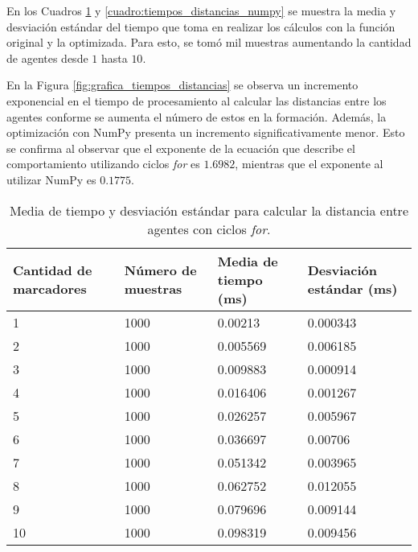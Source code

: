 En los Cuadros \ref{cuadro:tiempos_distancias_for} y \ref{cuadro:tiempos_distancias_numpy} se muestra la media y desviación estándar del tiempo que toma en realizar los cálculos con la función original y la optimizada. Para esto, se tomó mil muestras aumentando la cantidad de agentes desde $1$ hasta $10$. 

En la Figura \ref{fig:grafica_tiempos_distancias} se observa un incremento exponencial en el tiempo de procesamiento al calcular las distancias entre los agentes conforme se aumenta el número de estos en la formación. Además, la optimización con NumPy presenta un incremento significativamente menor. Esto se confirma al observar que el exponente de la ecuación que describe el comportamiento utilizando ciclos \textit{for} es $1.6982$, mientras que el exponente al utilizar NumPy es $0.1775$.

\begin{table}[H]
	\centering
	\resizebox{\textwidth}{!} {
	\begin{tabular}{|l|l|l|l|}
		\hline
		\textbf{Cantidad de marcadores} & \textbf{Número de muestras} & \textbf{Media de tiempo (ms)} & \textbf{Desviación estándar (ms)} \\ \hline
		1 & 1000 & 0.00213 & 0.000343 \\ \hline
		2 & 1000 & 0.005569 & 0.006185 \\ \hline
		3 & 1000 & 0.009883 & 0.000914 \\ \hline
		4 & 1000 & 0.016406 & 0.001267 \\ \hline
		5 & 1000 & 0.026257 & 0.005967 \\ \hline
		6 & 1000 & 0.036697 & 0.00706 \\ \hline
		7 & 1000 & 0.051342 & 0.003965 \\ \hline
		8 & 1000 & 0.062752 & 0.012055 \\ \hline
		9 & 1000 & 0.079696 & 0.009144 \\ \hline
		10 & 1000 & 0.098319 & 0.009456 \\ \hline
	\end{tabular}}
	\caption{Media de tiempo y desviación estándar para calcular la distancia entre agentes con ciclos \textit{for}.}
	\label{cuadro:tiempos_distancias_for}
\end{table}

